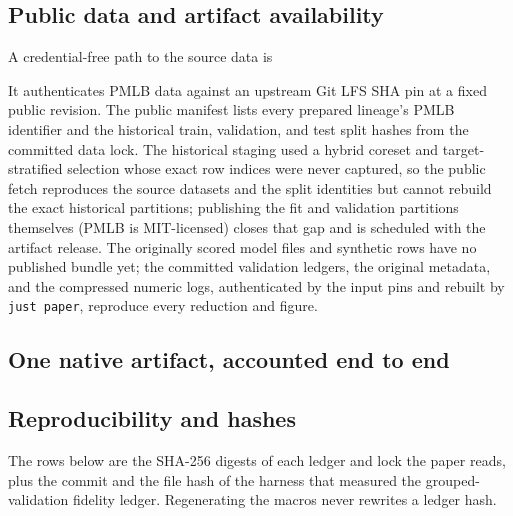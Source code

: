 \documentclass{article}
\begin{document}
\subsection{Public data and artifact availability}
\label{app:public-kit}
A credential-free path to the source data is
\par\smallskip{}\smallskip
\noindent
It authenticates PMLB data against an upstream Git LFS SHA pin at a fixed public revision. The public manifest lists every prepared lineage's PMLB identifier and the historical train, validation, and test split hashes from the committed data lock. The historical staging used a hybrid coreset and target-stratified selection whose exact row indices were never captured, so the public fetch reproduces the source datasets and the split identities but cannot rebuild the exact historical partitions; publishing the fit and validation partitions themselves (PMLB is MIT-licensed) closes that gap and is scheduled with the artifact release. The originally scored model files and synthetic rows have no published bundle yet; the committed validation ledgers, the original metadata, and the compressed numeric logs, authenticated by the input pins and rebuilt by \texttt{just paper}, reproduce every reduction and figure.

\subsection{One native artifact, accounted end to end}
\label{app:native-bytes}


\subsection{Reproducibility and hashes}


The rows below are the SHA-256 digests of each ledger and lock the paper reads, plus the commit and the file hash of the harness that measured the grouped-validation fidelity ledger. Regenerating the macros never rewrites a ledger hash.
\resizebox{\linewidth}{!}{\begin{minipage}{7.16in}\end{minipage}}
\end{document}
